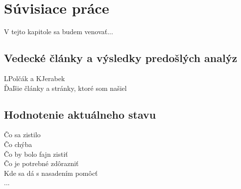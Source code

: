 \chapter{Súvisiace práce}
\label{related-work}

V tejto kapitole sa budem venovať...


\section{Vedecké články a výsledky predošlých analýz}

LPolčák a KJerabek \cite{nel-http-archive}\cite{dp-security-issues-nel}
\\
Ďaľšie články a stránky, ktoré som našiel

\section{Hodnotenie aktuálneho stavu}

Čo sa zistilo
\\
Čo chýba
\\
Čo by bolo fajn zistiť
\\
Čo je potrebné zdôrazniť
\\
Kde sa dá s nasadením pomôcť
\\
...
